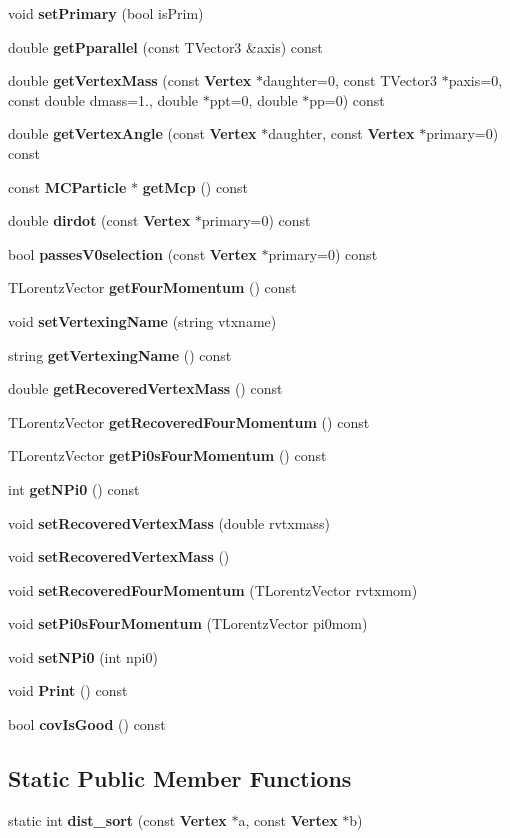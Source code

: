\begin{DoxyCompactItemize}
\item 
void \textbf{ set\+Primary} (bool is\+Prim)
\item 
double \textbf{ get\+Pparallel} (const T\+Vector3 \&axis) const
\item 
double \textbf{ get\+Vertex\+Mass} (const \textbf{ Vertex} $\ast$daughter=0, const T\+Vector3 $\ast$paxis=0, const double dmass=1., double $\ast$ppt=0, double $\ast$pp=0) const
\item 
double \textbf{ get\+Vertex\+Angle} (const \textbf{ Vertex} $\ast$daughter, const \textbf{ Vertex} $\ast$primary=0) const
\item 
const \textbf{ M\+C\+Particle} $\ast$ \textbf{ get\+Mcp} () const
\item 
double \textbf{ dirdot} (const \textbf{ Vertex} $\ast$primary=0) const
\item 
bool \textbf{ passes\+V0selection} (const \textbf{ Vertex} $\ast$primary=0) const
\item 
T\+Lorentz\+Vector \textbf{ get\+Four\+Momentum} () const
\item 
void \textbf{ set\+Vertexing\+Name} (string vtxname)
\item 
string \textbf{ get\+Vertexing\+Name} () const
\item 
double \textbf{ get\+Recovered\+Vertex\+Mass} () const
\item 
T\+Lorentz\+Vector \textbf{ get\+Recovered\+Four\+Momentum} () const
\item 
T\+Lorentz\+Vector \textbf{ get\+Pi0s\+Four\+Momentum} () const
\item 
int \textbf{ get\+N\+Pi0} () const
\item 
void \textbf{ set\+Recovered\+Vertex\+Mass} (double rvtxmass)
\item 
void \textbf{ set\+Recovered\+Vertex\+Mass} ()
\item 
void \textbf{ set\+Recovered\+Four\+Momentum} (T\+Lorentz\+Vector rvtxmom)
\item 
void \textbf{ set\+Pi0s\+Four\+Momentum} (T\+Lorentz\+Vector pi0mom)
\item 
void \textbf{ set\+N\+Pi0} (int npi0)
\item 
void \textbf{ Print} () const
\item 
bool \textbf{ cov\+Is\+Good} () const
\end{DoxyCompactItemize}
\subsection*{Static Public Member Functions}
\begin{DoxyCompactItemize}
\item 
static int \textbf{ dist\+\_\+sort} (const \textbf{ Vertex} $\ast$a, const \textbf{ Vertex} $\ast$b)
\end{DoxyCompactItemize}

